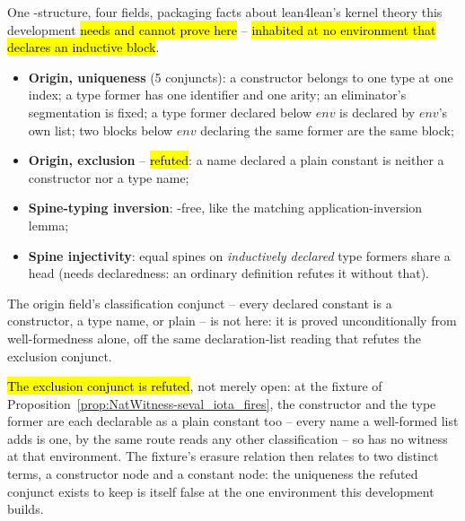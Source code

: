\begin{definition}
\label{def:UpstreamAsks}
\leanok
{}
\stAssumed{}  One -structure, four fields, packaging facts about
lean4lean's kernel theory this development \hl{needs and cannot prove here} -- \hl{inhabited at no
environment that declares an inductive block}.
\begin{itemize}
\item \textbf{Origin, uniqueness} (5 conjuncts): a constructor belongs to one type at one index; a
type former has one \lbox{} identifier and one arity; an eliminator's segmentation is fixed; a
type former declared below $env$ is declared by $env$'s own list; two blocks below $env$ declaring
the same former are the same block;
\item \textbf{Origin, exclusion} -- \hl{refuted}: a name declared a plain constant is neither a
constructor nor a type name;
\item \textbf{Spine-typing inversion}: -free, like the matching application-inversion
lemma;
\item \textbf{Spine injectivity}: equal spines on \emph{inductively declared} type formers share a
head (needs declaredness: an ordinary definition refutes it without that).
\end{itemize}
 The origin field's classification conjunct -- every declared constant is a
constructor, a type name, or plain -- is not here: it is proved unconditionally from
well-formedness alone, off the same declaration-list reading that refutes the exclusion conjunct.
\end{definition}

\begin{remark}
 \hl{The exclusion conjunct is refuted}, not merely open: at the 
fixture of Proposition~\ref{prop:NatWitness-seval_iota_fires}, the constructor  and
the type former  are each declarable as a plain constant too -- every name a
well-formed list adds is one, by the same route  reads any other classification
-- so  has no witness at that environment. The fixture's erasure relation then
relates  to two distinct \lbox{} terms, a constructor node and a constant node: the
uniqueness the refuted conjunct exists to keep is itself false at the one environment this
development builds.
\end{remark}

